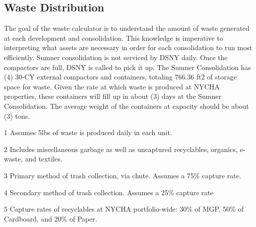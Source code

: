 \pagebreak
\pagestyle{fancy}
\fancyhf{}
\renewcommand{\chaptermark}[1]{\markboth{#1}{}}
\fancyfoot[LE,RO]{\thepage}
\parbox[T][3in][c]{\textwidth}{
\textcolor{ccorange}{\section{Waste Distribution}}
The goal of the waste calculator is to understand the amount of waste generated at each development and consolidation. This knowledge is imperative to interpreting what assets are necessary in order for each consolidation to run most efficiently. Sumner consolidation is not serviced by DSNY daily. Once the compactors are full, DSNY is called to pick it up. The Sumner Consolidation has (4) 30-CY external compactors and containers, totaling 766.36 ft2 of storage space for waste. Given the rate at which waste is produced at NYCHA properties, these containers will fill up in about (3) days at the Sumner Consolidation. The average weight of the containers at capacity should be about (3) tons.
}

\begin{table}[H]
\begin{threeparttable}
\small



\end{threeparttable}
\end{table}

\pagebreak
\parbox[T][3in][c]{\textwidth}{}
\begin{table}[H]
\begin{threeparttable}
\small



\begin{tablenotes}
\item [1] Assumes 5lbs of waste is produced daily in each unit.
\item [2] Includes miscellaneous garbage as well as uncaptured recyclables, organics, e-waste, and textiles.
\item [3] Primary method of trash collection, via chute. Assumes a 75\% capture rate.
\item [4] Secondary method of trash collection. Assumes a 25\% capture rate
\item [5] Capture rates of recyclables at NYCHA portfolio-wide: 30\% of MGP, 50\% of Cardboard, and 20\% of Paper. 
\end{tablenotes}
\end{threeparttable}
\end{table}


